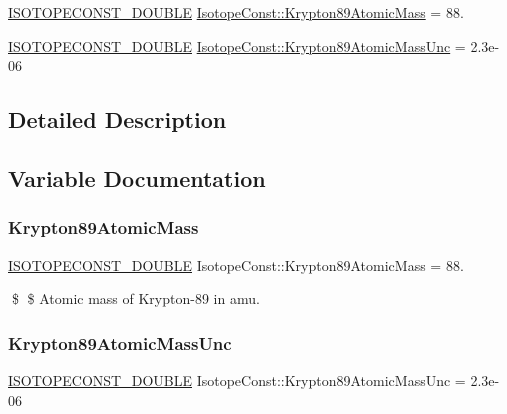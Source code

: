 \begin{DoxyCompactItemize}
\item 
\mbox{\hyperlink{group___isotope_const-_macros_ga8f45a7272ce02c0b4c65c44636ed719a}{I\+S\+O\+T\+O\+P\+E\+C\+O\+N\+S\+T\+\_\+\+D\+O\+U\+B\+LE}} \mbox{\hyperlink{group___isotope_const-_krypton-_kr89_gaf97f79acf43ab0d0b4bc14bd16bbfb60}{Isotope\+Const\+::\+Krypton89\+Atomic\+Mass}} = 88.
\item 
\mbox{\hyperlink{group___isotope_const-_macros_ga8f45a7272ce02c0b4c65c44636ed719a}{I\+S\+O\+T\+O\+P\+E\+C\+O\+N\+S\+T\+\_\+\+D\+O\+U\+B\+LE}} \mbox{\hyperlink{group___isotope_const-_krypton-_kr89_gafc74670d2d6bc4388cf3fd74e1a959ff}{Isotope\+Const\+::\+Krypton89\+Atomic\+Mass\+Unc}} = 2.\+3e-\/06
\end{DoxyCompactItemize}


\subsection{Detailed Description}


\subsection{Variable Documentation}
\mbox{\label{group___isotope_const-_krypton-_kr89_gaf97f79acf43ab0d0b4bc14bd16bbfb60}} 
\subsubsection{\texorpdfstring{Krypton89\+Atomic\+Mass}{Krypton89AtomicMass}}
{\footnotesize\ttfamily \mbox{\hyperlink{group___isotope_const-_macros_ga8f45a7272ce02c0b4c65c44636ed719a}{I\+S\+O\+T\+O\+P\+E\+C\+O\+N\+S\+T\+\_\+\+D\+O\+U\+B\+LE}} Isotope\+Const\+::\+Krypton89\+Atomic\+Mass = 88.}

\$ \$ Atomic mass of Krypton-\/89 in amu. \mbox{\label{group___isotope_const-_krypton-_kr89_gafc74670d2d6bc4388cf3fd74e1a959ff}} 
\subsubsection{\texorpdfstring{Krypton89\+Atomic\+Mass\+Unc}{Krypton89AtomicMassUnc}}
{\footnotesize\ttfamily \mbox{\hyperlink{group___isotope_const-_macros_ga8f45a7272ce02c0b4c65c44636ed719a}{I\+S\+O\+T\+O\+P\+E\+C\+O\+N\+S\+T\+\_\+\+D\+O\+U\+B\+LE}} Isotope\+Const\+::\+Krypton89\+Atomic\+Mass\+Unc = 2.\+3e-\/06}

